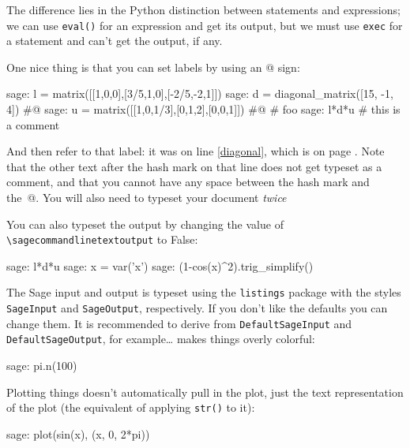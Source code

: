 \documentclass{article}
\begin{document}
The difference lies in the Python distinction between statements and
expressions; we can use \texttt{eval()} for an expression and get its
output, but we must use \texttt{exec} for a statement and can't get the
output, if any.

One nice thing is that you can set labels by using an @ sign:

\begin{sagecommandline}
  sage: l = matrix([[1,0,0],[3/5,1,0],[-2/5,-2,1]])
  sage: d = diagonal_matrix([15, -1, 4]) #@\label{diagonal}
  sage: u = matrix([[1,0,1/3],[0,1,2],[0,0,1]]) #@\label{anotherlabel} \# foo
  sage: l*d*u   # this is a comment
\end{sagecommandline}

And then refer to that label: it was on line \ref{diagonal}, which is on
page \pageref{diagonal}. Note that the other text after the hash mark on
that line does not get typeset as a comment, and that you cannot have
any space between the hash mark and the~@. You will also need to typeset
your document \emph{twice}

You can also typeset the output by changing the value of
\verb|\sagecommandlinetextoutput| to False:
\renewcommand{\sagecommandlinetextoutput}{False}
\begin{sagecommandline}
  sage: l*d*u
  sage: x = var('x')
  sage: (1-cos(x)^2).trig_simplify()
\end{sagecommandline}

\renewcommand{\sagecommandlinetextoutput}{True}

The Sage input and output is typeset using the \texttt{listings} package
with the styles \texttt{SageInput} and \texttt{SageOutput},
respectively. If you don't like the defaults you can change them. It is
recommended to derive from \texttt{DefaultSageInput} and
\texttt{DefaultSageOutput}, for example\ldots
{}
makes things overly colorful:
\begin{sagecommandline}
  sage: pi.n(100)
\end{sagecommandline}

Plotting things doesn't automatically pull in the plot, just the text
representation of the plot (the equivalent of applying \texttt{str()} to
it):

\begin{sagecommandline}
  sage: plot(sin(x), (x, 0, 2*pi))
\end{sagecommandline}
\end{document}
